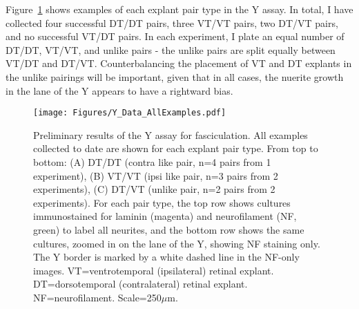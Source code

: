 Figure~\ref{Figures/Y_Data_AllExamples} shows examples of each explant pair type in the Y assay.
In total, I have collected four successful DT/DT pairs, three VT/VT pairs, two DT/VT pairs, and no successful VT/DT pairs.
In each experiment, I plate an equal number of DT/DT, VT/VT, and unlike pairs - the unlike pairs are split equally between VT/DT and DT/VT.
Counterbalancing the placement of VT and DT explants in the unlike pairings will be important, given that in all cases, the nuerite growth in the lane of the Y appears to have a rightward bias.
\begin{figure}[hbtp]
    \begin{center}
        \texttt{[image: Figures/Y\_Data\_AllExamples.pdf]}
        \caption[Preliminary results of the Y assay for fasciculation.]
        {Preliminary results of the Y assay for fasciculation.
		All examples collected to date are shown for each explant pair type.
		From top to bottom: (A) DT/DT (contra like pair, n=4 pairs from 1 experiment), (B) VT/VT (ipsi like pair, n=3 pairs from 2 experiments), (C) DT/VT (unlike pair, n=2 pairs from 2 experiments).
		For each pair type, the top row shows cultures immunostained for laminin (magenta) and neurofilament (NF, green) to label all neurites, and the bottom row shows the same cultures, zoomed in on the lane of the Y, showing NF staining only.
		The Y border is marked by a white dashed line in the NF-only images.
		VT=ventrotemporal (ipsilateral) retinal explant.
		DT=dorsotemporal (contralateral) retinal explant.
		NF=neurofilament.
		Scale=250$\mu$m.
		}
        \label{Figures/Y_Data_AllExamples}
    \end{center}
\end{figure}

